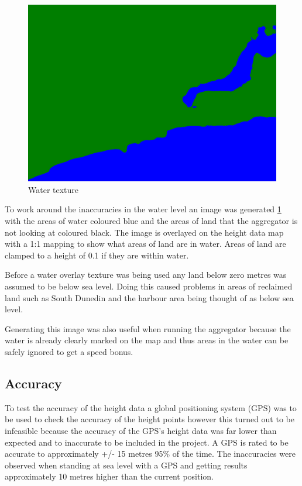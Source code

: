 \documentclass[12pt]{report}
\begin{document}
\begin{figure}
\includegraphics[scale=0.4]{terrain.png}
\caption{Water texture}
\label{overlaytexture}
\end{figure}
To work around the inaccuracies in the water level an image was generated \ref{overlaytexture} with the areas of water coloured blue and the areas of land that the aggregator is not looking at coloured black. The image is overlayed on the height data map with a 1:1 mapping to show what areas of land are in water. Areas of land are clamped to a height of 0.1 if they are within water. 

Before a water overlay texture was being used any land below zero metres was assumed to be below sea level. Doing this caused problems in areas of reclaimed land such as South Dunedin and the harbour area being thought of as below sea level. 

 Generating this image was also useful when running the aggregator because the water is already clearly marked on the map and thus areas in the water can be safely ignored to get a speed bonus. 

\subsection{Accuracy}
To test the accuracy of the height data a global positioning system (GPS) was to be used to check the accuracy of the height points however this turned out to be infeasible because the accuracy of the GPS's height data was far lower than expected and to inaccurate to be included in the project. A GPS is rated to be accurate to approximately +/- 15 metres 95\% of the time\cite{gpsaltitude}. The inaccuracies were observed when standing at sea level with a GPS and getting results approximately 10 metres higher than the current position.
\end{document}
